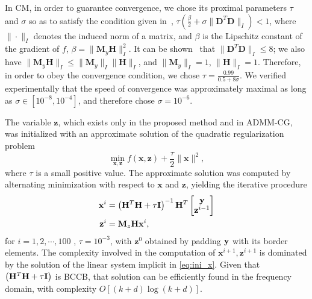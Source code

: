 \documentclass[10pt,twocolumn,twoside]{IEEEtran}
\newcommand{\Hm}{\mathbf{H}} %
\newcommand{\y}{\mathbf{y}} %
\newcommand{\x}{\mathbf{x}} %
\newcommand{\z}{\mathbf{z}} %
\newcommand{\D}{\mathbf{D}} %
\newcommand{\M}{\mathbf{M}} %
\begin{document}
In CM, in order to guarantee convergence, we chose its proximal parameters $\tau$ and $\sigma$ so as to satisfy the condition given in~\cite{Condat2014}, $\tau( \frac{\beta}{2} + \sigma \| \D^T \D \|_I ) < 1$, where $\| \cdot \|_I$ denotes the induced norm of a matrix, and $\beta$ is the Lipschitz constant of the gradient of $f$, $\beta = \| \M_y \Hm\|_I^2$. It can be shown~\cite{Chambolle2004} that $\| \D^T \D \|_I \leq 8$; we also have $\| \M_y \Hm\|_I \leq \| \M_y \|_I \| \Hm\|_I$, and $\| \M_y \|_I = 1$, $\| \Hm \|_I = 1$.  Therefore, in order to obey the convergence condition, we chose $\tau = \frac{0.99}{0.5+8 \sigma}$. We verified experimentally that the speed of convergence was approximately maximal as long as $\sigma \in [10^{-8}, 10^{-4}]$, and therefore chose $\sigma = 10^{-6}$.



The variable $\z$, which exists only in the proposed method and in ADMM-CG, was initialized with an approximate solution of the  quadratic regularization problem
\begin{equation*}
	 \min_{\x,\z} f(\x,\z) + \frac{\tau}{2}\|\x \|^2,
\end{equation*}
where $\tau$ is a small positive value.  The approximate solution was computed by alternating minimization with respect to  $\x$ and  $\z$, yielding the iterative procedure
\begin{align}
   \label{eq:ini_x}
   \x^i & = \left( \Hm^T\Hm + \tau{\bf I}\right)^{-1}\Hm^T
                        \begin{bmatrix}
                           \y \\
                           \z^{i-1}
                         \end{bmatrix}\\
  \label{eq:ini_z}
  \z^i & = {\bf M}_z\Hm \x^i,
\end{align}
for $i=1,2,\cdots,100$ , $\tau =10^{-3}$, with $\z^0$ obtained by padding $\bf y$ with its border elements.  The complexity involved in the computation of  $\x^{i+1},\z^{i+1}$ is dominated by the solution of the linear system implicit in \eqref{eq:ini_x}. Given that  $\left( \Hm^T\Hm + \tau{\bf I}\right)$ is BCCB, that solution can be efficiently found in the frequency domain, with complexity $O[(k+d) \log (k+d)]$.
\end{document}
